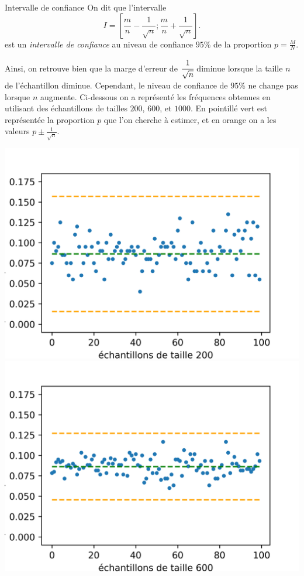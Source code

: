 \documentclass[11pt]{article}
\begin{document}
\begin{defi}{Intervalle de confiance}
  On dit que l'intervalle
  \[
    I = \left[ \frac{m}{n}-\frac{1}{\sqrt n}; \frac{m}{n}+\frac{1}{\sqrt n}
    \right].
  \]
  est un \emph{intervalle de confiance} au niveau de confiance $95$\% de la
  proportion $p=\frac{M}{N}$.
\end{defi}
\noindent Ainsi, on retrouve bien que la marge d'erreur de $\cfrac{1}{\sqrt n}$ diminue
lorsque la taille $n$ de l'échantillon diminue. Cependant, le niveau de
confiance de $95$\% ne change pas lorsque $n$ augmente. Ci-dessous on a
représenté les fréquences obtenues en utilisant des échantillons de tailles
$200$, $600$, et $1000$. En pointillé vert est représentée la proportion $p$ que
l'on cherche à estimer, et en orange on a les valeurs $p\pm \frac{1}{\sqrt n}$.
\begin{center}
  \includegraphics[scale=.7]{simul_multiple-0.png}
  \includegraphics[scale=.7]{simul_multiple-1.png}

\end{center}
\end{document}
